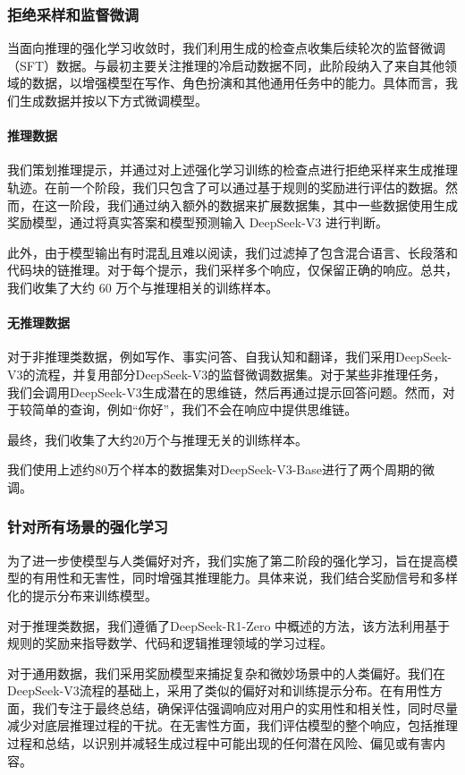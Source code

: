 \documentclass[lang=cn,a4paper,newtx]{elegantpaper}
\newcommand{\dsro}{DeepSeek-R1-Zero}
\begin{document}
\subsubsection{拒绝采样和监督微调}

当面向推理的强化学习收敛时，我们利用生成的检查点收集后续轮次的监督微调（SFT）数据。与最初主要关注推理的冷启动数据不同，此阶段纳入了来自其他领域的数据，以增强模型在写作、角色扮演和其他通用任务中的能力。具体而言，我们生成数据并按以下方式微调模型。
\label{sec:method:r1:sft}

\paragraph{推理数据}
我们策划推理提示，并通过对上述强化学习训练的检查点进行拒绝采样来生成推理轨迹。在前一个阶段，我们只包含了可以通过基于规则的奖励进行评估的数据。然而，在这一阶段，我们通过纳入额外的数据来扩展数据集，其中一些数据使用生成奖励模型，通过将真实答案和模型预测输入 DeepSeek-V3 进行判断。

此外，由于模型输出有时混乱且难以阅读，我们过滤掉了包含混合语言、长段落和代码块的链推理。对于每个提示，我们采样多个响应，仅保留正确的响应。总共，我们收集了大约 60 万个与推理相关的训练样本。

\paragraph{无推理数据}
对于非推理类数据，例如写作、事实问答、自我认知和翻译，我们采用DeepSeek-V3的流程，并复用部分DeepSeek-V3的监督微调数据集。对于某些非推理任务，我们会调用DeepSeek-V3生成潜在的思维链，然后再通过提示回答问题。然而，对于较简单的查询，例如“你好”，我们不会在响应中提供思维链。

最终，我们收集了大约20万个与推理无关的训练样本。

我们使用上述约80万个样本的数据集对DeepSeek-V3-Base进行了两个周期的微调。

\subsubsection{针对所有场景的强化学习}

为了进一步使模型与人类偏好对齐，我们实施了第二阶段的强化学习，旨在提高模型的有用性和无害性，同时增强其推理能力。具体来说，我们结合奖励信号和多样化的提示分布来训练模型。

对于推理类数据，我们遵循了\dsro{} 中概述的方法，该方法利用基于规则的奖励来指导数学、代码和逻辑推理领域的学习过程。

对于通用数据，我们采用奖励模型来捕捉复杂和微妙场景中的人类偏好。我们在DeepSeek-V3流程的基础上，采用了类似的偏好对和训练提示分布。在有用性方面，我们专注于最终总结，确保评估强调响应对用户的实用性和相关性，同时尽量减少对底层推理过程的干扰。在无害性方面，我们评估模型的整个响应，包括推理过程和总结，以识别并减轻生成过程中可能出现的任何潜在风险、偏见或有害内容。
\end{document}
